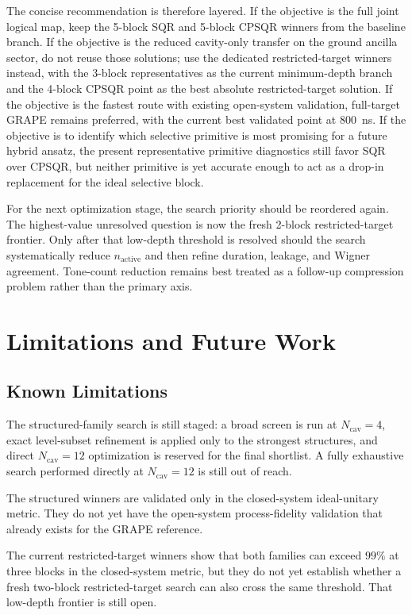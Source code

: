 ﻿\documentclass[aps,pra,twocolumn,reprint,amsmath,amssymb,floatfix]{revtex4-2}
\begin{document}
The concise recommendation is therefore layered. If the objective is the full
joint logical map, keep the 5-block SQR and 5-block CPSQR winners from the
baseline branch. If the objective is the reduced cavity-only transfer on the
ground ancilla sector, do not reuse those solutions; use the dedicated
restricted-target winners instead, with the 3-block representatives as the
current minimum-depth branch and the 4-block CPSQR point as the best absolute
restricted-target solution. If the objective is the fastest route with existing
open-system validation, full-target GRAPE remains preferred, with the current
best validated point at \SI{800}{ns}. If the objective is to identify which
selective primitive is most promising for a future hybrid ansatz, the present
representative primitive diagnostics still favor SQR over CPSQR, but neither
primitive is yet accurate enough to act as a drop-in replacement for the ideal
selective block.

For the next optimization stage, the search priority should be reordered again.
The highest-value unresolved question is now the fresh 2-block restricted-target
frontier. Only after that low-depth threshold is resolved should the search
systematically reduce $n_{\mathrm{active}}$ and then refine duration, leakage,
and Wigner agreement. Tone-count reduction remains best treated as a follow-up
compression problem rather than the primary axis.

\section{Limitations and Future Work}

\subsection{Known Limitations}

The structured-family search is still staged: a broad screen is run at
$N_{\mathrm{cav}}=4$, exact level-subset refinement is applied only to the
strongest structures, and direct $N_{\mathrm{cav}}=12$ optimization is reserved
for the final shortlist. A fully exhaustive search performed directly at
$N_{\mathrm{cav}}=12$ is still out of reach.

The structured winners are validated only in the closed-system ideal-unitary
metric. They do not yet have the open-system process-fidelity validation that
already exists for the GRAPE reference.

The current restricted-target winners show that both families can exceed $99\%$
at three blocks in the closed-system metric, but they do not yet establish
whether a fresh two-block restricted-target search can also cross the same
threshold. That low-depth frontier is still open.
\end{document}
